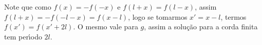 Note que como $f(x)=-f(-x)$ e $f(l+x)=f(l-x)$, assim
$f(l+x)=-f(-l-x)=f(x-l)$, logo se tomarmos $x'=x-l$, termos
$f(x')=f(x'+2l)$. O mesmo vale para $g$, assim a solu\c{c}\~ao
para a corda finita tem per\'\i odo $2l$.

%
%
%
